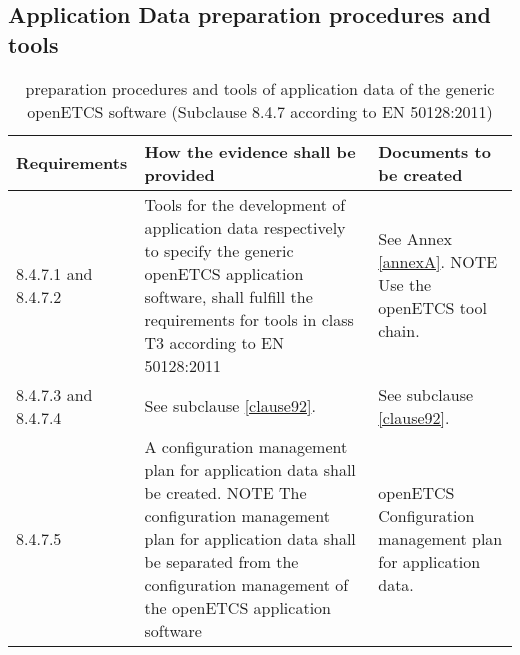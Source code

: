 \documentclass{template/openetcs_report}
\begin{document}
\subsection{Application Data preparation procedures and tools}
{\footnotesize\sffamily\centering
\begin{longtable}{|p{2cm}|p{9cm}|p{3cm}|}
\caption{preparation procedures and tools of application data of the generic openETCS software (Subclause 8.4.7 according to EN 50128:2011)}\\
\hline
\bfseries Requirements & \bfseries How the evidence shall be provided & \bfseries Documents to be created\\
\hline
\hline
\endhead
\hline
\endfoot

8.4.7.1 and 8.4.7.2 & Tools for the development of application data respectively to specify the generic openETCS application software, shall fulfill the requirements for tools in class T3 according to EN 50128:2011
& See Annex \ref{annexA}.
NOTE
Use the openETCS tool chain.\\ 
\hline
8.4.7.3 and 8.4.7.4 & See subclause \ref{clause92}. & See subclause \ref{clause92}.\\ 
\hline
8.4.7.5 & A configuration management plan for application data shall be created.
\linebreak
\linebreak
NOTE\linebreak
The configuration management plan for application data shall be separated from the configuration management of the openETCS application software
& openETCS Configuration management plan for application data.\\ 
\hline
\end{longtable}}
\end{document}
